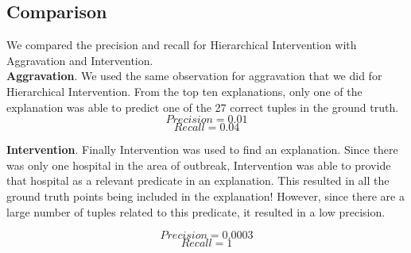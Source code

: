 \subsection{Comparison}
We compared the precision and recall for Hierarchical Intervention with Aggravation and Intervention. 
\\
\textbf{Aggravation}. We used the same observation for aggravation that we did for Hierarchical Intervention. From the top ten explanations, only one of the explanation was able to predict one of the 27 correct tuples in the ground truth.
$$Precision = 0.01$$
$$Recall = 0.04$$


\textbf{Intervention}. Finally Intervention was used to find an explanation. Since there was only one hospital in the area of outbreak, Intervention was able to provide that hospital as a relevant predicate in an explanation. This resulted in all the ground truth points being included in the explanation! However, since there are a large number of tuples related to this predicate, it resulted in a low precision.

$$Precision = 0.0003$$
$$Recall = 1$$











